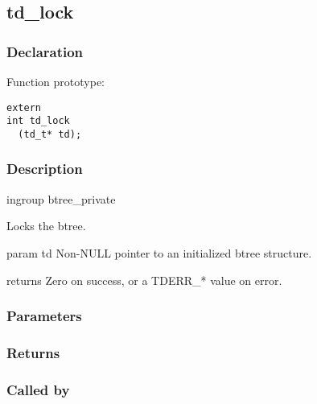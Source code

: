 
\newpage
\subsection{td\_lock}
\subsubsection{Declaration} Function prototype:

\begin{verbatim}
extern
int td_lock
  (td_t* td);
\end{verbatim}

\subsubsection{Description}

 
 ingroup btree\_private 

 Locks the btree.

 param td Non-NULL pointer to an initialized btree structure.

 returns Zero on success, or a TDERR\_* value on error.
 

\subsubsection{Parameters}
\subsubsection{Returns}
\subsubsection{Called by}
